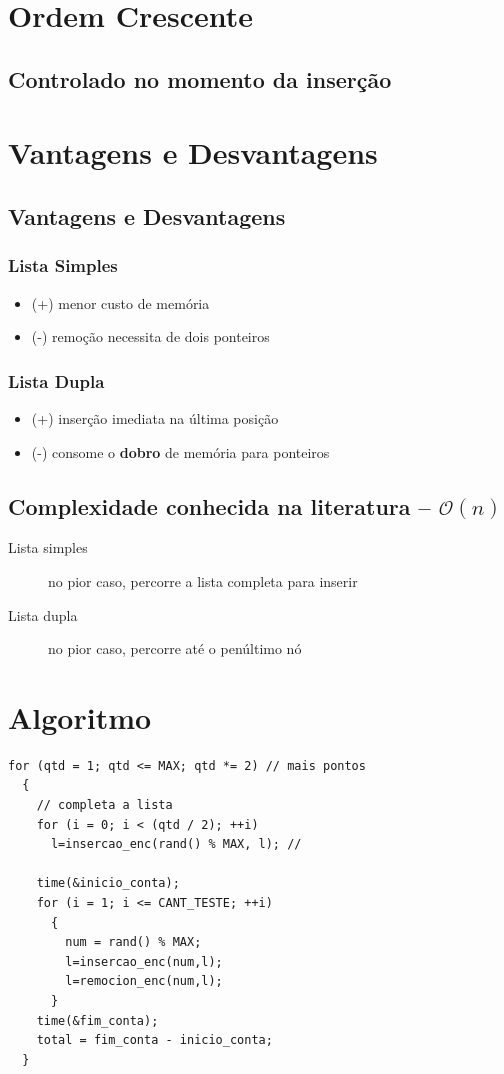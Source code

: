 \documentclass[bigger]{beamer}
\begin{document}
\section{Ordem Crescente}
\label{sec-3}
\subsection{Controlado no momento da inserção}
\label{sec-3-1}
\section{Vantagens e Desvantagens}
\label{sec-4}
\subsection{Vantagens e Desvantagens}
\label{sec-4-1}
\subsubsection{Lista Simples}
\label{sec-4-1-1}
\begin{itemize}
\item (+) menor custo de memória
\item (-) remoção necessita de dois ponteiros
\end{itemize}
\subsubsection{Lista Dupla}
\label{sec-4-1-2}
\begin{itemize}
\item (+) inserção imediata na última posição
\item (-) consome o \textbf{dobro} de memória para ponteiros
\end{itemize}
\subsection{Complexidade conhecida na literatura -- $\mathcal{O}(n)$}
\label{sec-4-2}
\begin{description}
\item[{Lista simples}] no pior caso, percorre a lista completa para inserir
\item[{Lista dupla}] no pior caso, percorre até o penúltimo nó
\end{description}
\section{Algoritmo}
\label{sec-5}
\begin{verbatim}
for (qtd = 1; qtd <= MAX; qtd *= 2) // mais pontos
  {
    // completa a lista
    for (i = 0; i < (qtd / 2); ++i)
      l=insercao_enc(rand() % MAX, l); //

    time(&inicio_conta);
    for (i = 1; i <= CANT_TESTE; ++i)
      {
        num = rand() % MAX;
        l=insercao_enc(num,l);
        l=remocion_enc(num,l);
      }
    time(&fim_conta);
    total = fim_conta - inicio_conta;
  }
\end{verbatim}
\end{document}
